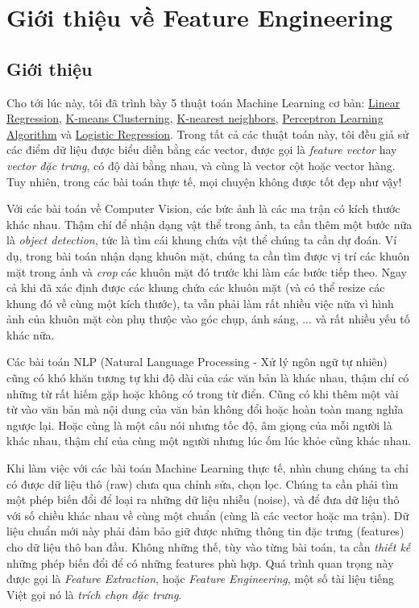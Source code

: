 \chapter{Giới thiệu về Feature Engineering}
 
 
\section{Giới thiệu }
 
Cho tới lúc này, tôi đã trình bày 5 thuật toán Machine Learning cơ bản: \href{http://machinelearningcoban.com/2016/12/28/linearregression/}{Linear Regression}, \href{http://machinelearningcoban.com/2017/01/01/kmeans/}{K-means Clusterning}, \href{http://machinelearningcoban.com/2017/01/08/knn/}{K-nearest neighbors}, \href{http://machinelearningcoban.com/2017/01/21/perceptron/}{Perceptron Learning Algorithm} và \href{http://machinelearningcoban.com/2017/01/27/logisticregression/}{Logistic Regression}. Trong tất cả các thuật toán này, tôi đều giả sử các điểm dữ liệu được biểu diễn bằng các vector, được gọi là \textit{feature vector} hay \textit{vector đặc trưng}, có độ dài bằng nhau, và cùng là vector cột hoặc vector hàng. Tuy nhiên, trong các bài toán thực tế, mọi chuyện không được tốt đẹp như vậy! 
 
Với các bài toán về Computer Vision, các bức ảnh là các ma trận có kích thước khác nhau. Thậm chí để nhận dạng vật thể trong ảnh, ta cần thêm một bước nữa là \textit{object detection}, tức là tìm cái khung chứa vật thể chúng ta cần dự đoán. Ví dụ, trong bài toán nhận dạng khuôn mặt, chúng ta cần tìm được vị trí các khuôn mặt trong ảnh và \textit{crop} các khuôn mặt đó trước khi làm các bước tiếp theo. Ngay cả khi đã xác định được các khung chứa các khuôn mặt (và có thể resize các khung đó về cùng một kích thước), ta vẫn phải làm rất nhiều việc nữa vì hình ảnh của khuôn mặt còn phụ thưộc vào góc chụp, ánh sáng, ... và rất nhiều yếu tố khác nữa.  
 
Các bài toán NLP (Natural Language Processing - Xử lý ngôn ngữ tự nhiên) cũng có khó khăn tương tự khi độ dài của các văn bản là khác nhau, thậm chí có những từ rất hiếm gặp hoặc không có trong từ điển. Cũng có khi thêm một vài từ vào văn bản mà nội dung của văn bản không đổi hoặc hoàn toàn mang nghĩa ngược lại. Hoặc cùng là một câu nói nhưng tốc độ, âm giọng của mỗi người là khác nhau, thậm chí của cùng một người nhưng lúc ốm lúc khỏe cũng khác nhau.  
 
Khi làm việc với các bài toán Machine Learning thực tế, nhìn chung chúng ta chỉ có được dữ liệu thô (raw) chưa qua chỉnh sửa, chọn lọc. Chúng ta cần phải tìm một phép biến đổi để loại ra những dữ liệu nhiễu (noise), và để đưa dữ liệu thô với số chiều khác nhau về cùng một chuẩn (cùng là các vector hoặc ma trận). Dữ liệu chuẩn mới này phải đảm bảo giữ được những thông tin đặc trưng (features) cho dữ liệu thô ban đầu. Không những thế, tùy vào từng bài toán, ta cần \textit{thiết kế} những phép biến đổi để có những features phù hợp. Quá trình quan trọng này được gọi là \textit{Feature Extraction}, hoặc \textit{Feature Engineering}, một số tài liệu tiếng Việt gọi nó là \textit{trích chọn đặc trưng}.  
 
